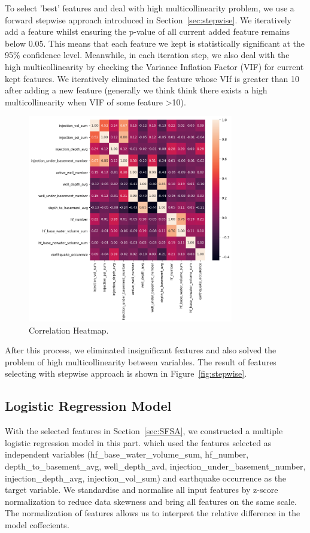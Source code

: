 \documentclass[final-report]{report-template}
\begin{document}
To select 'best' features and deal with high multicollinearity problem, we use a forward stepwise approach introduced in Section~\ref{sec:stepwise}. We iteratively add a feature whilst ensuring the p-value of all current added feature remains below 0.05. 
This means that each feature we kept is statistically significant at the 95\% confidence level. Meanwhile, in each iteration step, we also deal with the high multicollinearity by checking the Variance Inflation Factor (VIF) for current kept features.
We iteratively eliminated the feature whose VIf is greater than 10 after adding a new feature (generally we think think there exists a high multicollinearity when VIF of some feature \textgreater 10).

\begin{figure}
    \begin{center}
        \includegraphics[width=0.8\textwidth]{heatmap_all.png}
    \end{center}
    \caption{\label{fig:heatmap} Correlation Heatmap.}
\end{figure}

After this process, we eliminated insignificant features and also solved the problem of high multicollinearity between variables. 
The result of features selecting with stepwise approach is shown in Figure~\ref{fig:stepwise}. 

\subsection{Logistic Regression Model}
\label{sec:LRM}
With the selected features in Section~\ref{sec:SFSA}, we constructed a multiple logistic regression model in this part. which used the features selected as independent variables (hf\_base\_water\_volume\_sum, hf\_number, depth\_to\_basement\_avg, well\_depth\_avd, injection\_under\_basement\_number, injection\_depth\_avg, injection\_vol\_sum) and earthquake occurrence as the target variable.
We standardise and normalise all input features by z-score normalization \citep{patro2015normalization} to reduce data skewness and bring all features on the same scale. The normalization of features allows us to interpret the relative difference in the model coffecients.
\end{document}
